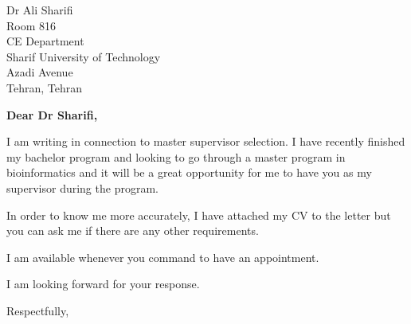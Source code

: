\documentclass[10pt]{letter} %
\begin{document}

\begin{letter}{Dr Ali Sharifi \\ Room 816 \\ CE Department \\ Sharif University of Technology \\ Azadi Avenue \\ Tehran, Tehran} %


\opening{\textbf{Dear Dr Sharifi,}}

I am writing in connection to master supervisor selection.
I have recently finished my bachelor program and looking to go through a master program in bioinformatics and it will be a great opportunity for me to have you as my supervisor during the program.

In order to know me more accurately, I have attached my CV to the letter but you can ask me if there are any other requirements.

I am available whenever you command to have an appointment.

I am looking forward for your response.

\vspace{2\parskip} %
\closing{Respectfully,}
\vspace{2\parskip} %



\end{letter}
 
\end{document}

